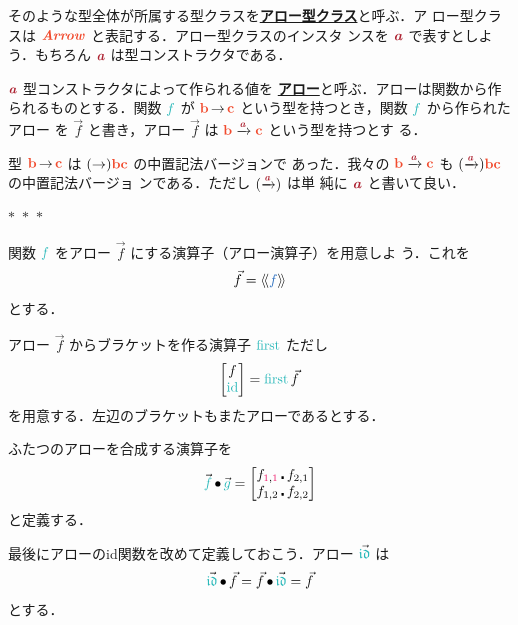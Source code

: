 \documentclass[a5paper,twoside,fleqn,draft]{jsbook}
\def\llangle{\langle\!\langle}
\def\rrangle{\rangle\!\rangle}
\def\constantColor{WildStrawberry}
\def\varColor{NavyBlue}
\def\funcColor{BlueGreen}
\def\typeColor{RedOrange}
\def\typeConstColor{Maroon}
\newcommand{\Langle}{\llangle}
\newcommand{\Rangle}{\rrangle}
\newcommand{\separator}{\begin{center}$*$~$*$~$*$\end{center}}
\newcommand{\keyword}[1]{{\underline{\textbf{#1}}}}
\newcommand{\mTypeConstructor}[1]{\textcolor{\typeConstColor}{\textbf{\textit{#1}}}}
\newcommand{\mConstant}[1]{\textcolor{\constantColor}{#1}}
\newcommand{\mOneNumber}{{\mConstant{1}}}
\newcommand{\mVar}[1]{\textcolor{\varColor}{#1}}
\newcommand{\mFunc}[1]{\textcolor{\funcColor}{#1}}
\newcommand{\mSpecialFunc}[1]{\textcolor{\funcColor}{\textrm{#1}}}
\newcommand{\mVarSpecialFunc}[1]{\textcolor{\funcColor}{\mathfrak{#1}}}
\newcommand{\mFFunc}{{\mFunc{f}}}
\newcommand{\mGFunc}{\mFunc{g}}
\DeclareMathOperator{\mFirst}{\mSpecialFunc{first}}
\DeclareMathOperator{\mId}{\mSpecialFunc{id}}
\DeclareMathOperator{\mIdCat}{\mVarSpecialFunc{id}}
\newcommand{\mArrowArrow}[1]{\xrightarrow{#1}}
\DeclareMathOperator{\mCompFunc}{\centerdot}
\DeclareMathOperator{\mCompCat}{\bullet}
\DeclareMathOperator{\mFuncArrow}{\rightarrow}
\newcommand{\mType}[1]{\textcolor{\typeColor}{\mathbf{#1}}}
\newcommand{\mB}{\mType{b}}
\newcommand{\mC}{\mType{c}}
\newcommand{\mArrowWith}[1]{\Langle\mVar{#1}\Rangle}
\newcommand{\mTypeClass}[1]{\textcolor{\typeColor}{\textbf{\textit{#1}}}}
\newcommand{\mArrowTypeClass}{\mTypeClass{Arrow}}
\newcommand{\mArrow}[1]{\Vec{#1}}
\begin{document}
そのような型全体が所属する型クラスを\keyword{アロー型クラス}と呼ぶ．ア
ロー型クラスは $\mArrowTypeClass$ と表記する．アロー型クラスのインスタ
ンスを $\mTypeConstructor{a}$ で表すとしよう．もちろん
$\mTypeConstructor{a}$ は型コンストラクタである．

$\mTypeConstructor{a}$ 型コンストラクタによって作られる値を
\keyword{アロー}と呼ぶ．アローは関数から作られるものとする．関数 $\mFFunc$
が $\mB\mFuncArrow\mC$ という型を持つとき，関数 $\mFFunc$ から作られたアロー
を $\mArrow{f}$ と書き，アロー $\mArrow{f}$ は
$\mB\mArrowArrow{\mTypeConstructor{a}}\mC$ という型を持つとす
る．

型 $\mB\mFuncArrow\mC$ は $(\mFuncArrow)\mB\mC$ の中置記法バージョンで
あった．我々の $\mB\mArrowArrow{\mTypeConstructor{a}}\mC$ も
$(\mArrowArrow{\mTypeConstructor{a}})\mB\mC$ の中置記法バージョ
ンである．ただし $(\mArrowArrow{\mTypeConstructor{a}})$ は単
純に $\mTypeConstructor{a}$ と書いて良い．

\separator

関数 $\mFFunc$ をアロー $\mArrow{f}$ にする演算子（アロー演算子）を用意しよ
う．これを
\begin{equation}
  \mArrow{f}
  =\mArrowWith{f}
\end{equation}
とする．

アロー $\mArrow{f}$ からブラケットを作る演算子 $\mFirst$ ただし
\begin{equation}
  \begin{bmatrix}
    f\\
    \mId
  \end{bmatrix}
  =
  \mFirst\mArrow{f}
\end{equation}
を用意する．左辺のブラケットもまたアローであるとする．

ふたつのアローを合成する演算子を
\begin{equation}
  \mArrow{\mFFunc}\mCompCat\mArrow{\mGFunc}
  =
  \begin{bmatrix}
    f_{\mOneNumber,\mOneNumber}\mCompFunc f_{2,1}\\
    f_{1,2}\mCompFunc f_{2,2}
  \end{bmatrix}
\end{equation}
と定義する．

最後にアローのid関数を改めて定義しておこう．アロー $\mArrow{\mIdCat}$
は
\begin{equation}
  \mArrow{\mIdCat}\mCompCat\mArrow{f}
  =\mArrow{f}\mCompCat\mArrow{\mIdCat}
  =\mArrow{f}
\end{equation}
とする．
\end{document}
